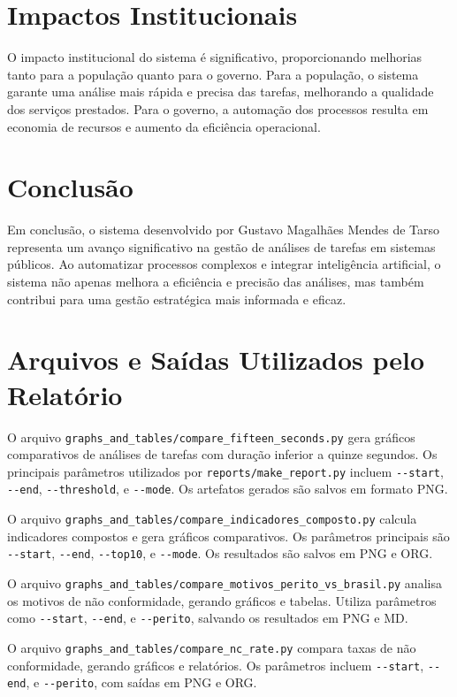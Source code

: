 \documentclass[11pt]{article}
\begin{document}
\section{Impactos Institucionais}
\label{sec:org2b9e906}
O impacto institucional do sistema é significativo, proporcionando melhorias tanto para a população quanto para o governo. Para a população, o sistema garante uma análise mais rápida e precisa das tarefas, melhorando a qualidade dos serviços prestados. Para o governo, a automação dos processos resulta em economia de recursos e aumento da eficiência operacional.

\section{Conclusão}
\label{sec:org27edf80}
Em conclusão, o sistema desenvolvido por Gustavo Magalhães Mendes de Tarso representa um avanço significativo na gestão de análises de tarefas em sistemas públicos. Ao automatizar processos complexos e integrar inteligência artificial, o sistema não apenas melhora a eficiência e precisão das análises, mas também contribui para uma gestão estratégica mais informada e eficaz.

\section{Arquivos e Saídas Utilizados pelo Relatório}
\label{sec:org0edcb9a}
O arquivo \texttt{graphs\_and\_tables/compare\_fifteen\_seconds.py} gera gráficos comparativos de análises de tarefas com duração inferior a quinze segundos. Os principais parâmetros utilizados por \texttt{reports/make\_report.py} incluem \texttt{-{}-start}, \texttt{-{}-end}, \texttt{-{}-threshold}, e \texttt{-{}-mode}. Os artefatos gerados são salvos em formato PNG.

O arquivo \texttt{graphs\_and\_tables/compare\_indicadores\_composto.py} calcula indicadores compostos e gera gráficos comparativos. Os parâmetros principais são \texttt{-{}-start}, \texttt{-{}-end}, \texttt{-{}-top10}, e \texttt{-{}-mode}. Os resultados são salvos em PNG e ORG.

O arquivo \texttt{graphs\_and\_tables/compare\_motivos\_perito\_vs\_brasil.py} analisa os motivos de não conformidade, gerando gráficos e tabelas. Utiliza parâmetros como \texttt{-{}-start}, \texttt{-{}-end}, e \texttt{-{}-perito}, salvando os resultados em PNG e MD.

O arquivo \texttt{graphs\_and\_tables/compare\_nc\_rate.py} compara taxas de não conformidade, gerando gráficos e relatórios. Os parâmetros incluem \texttt{-{}-start}, \texttt{-{}-end}, e \texttt{-{}-perito}, com saídas em PNG e ORG.
\end{document}
